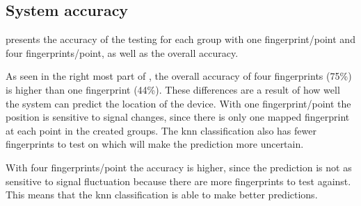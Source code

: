 \subsection{System accuracy}\label{sec:resultsSystemAccuracy}
 presents the accuracy of the testing for each group with one fingerprint/point and four fingerprints/point, as well as the overall accuracy.


As seen in the right most part of , the overall accuracy of four fingerprints (75\%) is higher than one fingerprint (44\%).
These differences are a result of how well the system can predict the location of the device.
With one fingerprint/point the position is sensitive to signal changes, since there is only one mapped fingerprint at each point in the created groups.
The \acrfull{knn} classification also has fewer fingerprints to test on which will make the prediction more uncertain.

\bigskip

With four fingerprints/point the accuracy is higher, since the prediction is not as sensitive to signal fluctuation because there are more fingerprints to test against.
This means that the \acrshort{knn} classification is able to make better predictions. 
